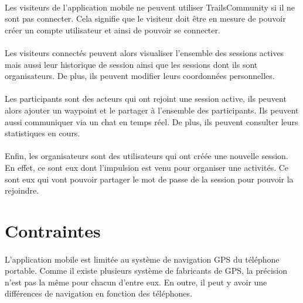 \documentclass[titlepage, 12pt]{report}
\begin{document}
\paragraph{}Les visiteurs de l'application mobile ne peuvent utiliser TrailsCommunity si il ne sont pas connecter. Cela signifie que le visiteur doit être en mesure de pouvoir créer un compte utilisateur et ainsi de pouvoir se connecter.

\paragraph{}Les visiteurs connectés peuvent alors visualiser l'ensemble des sessions actives mais aussi leur historique de session ainsi que les sessions dont ils sont organisateurs.
De plus, ils peuvent modifier leurs coordonnées personnelles.

\paragraph{}Les participants sont des acteurs qui ont rejoint une session active, ils peuvent alors ajouter un waypoint et le partager à l'ensemble des participants. Ils peuvent aussi communiquer via un chat en temps réel. De plus, ils peuvent consulter leurs statistiques en cours.

\paragraph{}Enfin, les organisateurs sont des utilisateurs qui ont créée une nouvelle session. En effet, ce sont eux dont l'impulsion est venu pour organiser une activités. Ce sont eux qui vont pouvoir partager le mot de passe de la session pour pouvoir la rejoindre.

\section{Contraintes}

\paragraph{}L'application mobile est limitée au système de navigation GPS du téléphone portable. Comme il existe plusieurs système de fabricants de GPS, la précision n'est pas la même pour chacun d'entre eux. En outre, il peut y avoir une différences de navigation en fonction des téléphones.
\end{document}
